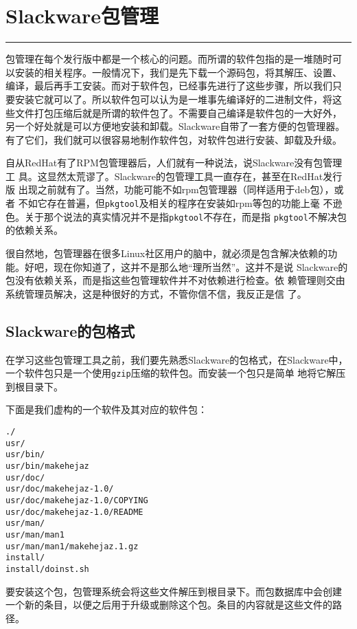 \chapter{Slackware包管理}
\label{chap:packageManagement}
\begin{flushleft}
\rule[0mm]{\textwidth}{.1pt}
\end{flushleft}

包管理在每个发行版中都是一个核心的问题。而所谓的软件包指的是一堆随时可
以安装的相关程序。一般情况下，我们是先下载一个源码包，将其解压、设置、
编译，最后再手工安装。而对于软件包，已经事先进行了这些步骤，所以我们只
要安装它就可以了。所以软件包可以认为是一堆事先编译好的二进制文件，将这
些文件打包压缩后就是所谓的软件包了。不需要自己编译是软件包的一大好外，
另一个好处就是可以方便地安装和卸载。Slackware自带了一套方便的包管理器。
有了它们，我们就可以很容易地制作软件包，对软件包进行安装、卸载及升级。

自从RedHat有了RPM包管理器后，人们就有一种说法，说Slackware没有包管理工
具。这显然太荒谬了。Slackware的包管理工具一直存在，甚至在RedHat发行版
出现之前就有了。当然，功能可能不如rpm包管理器（同样适用于deb包），或者
不如它存在普遍，但\texttt{pkgtool}及相关的程序在安装如rpm等包的功能上毫
不逊色。关于那个说法的真实情况并不是指\texttt{pkgtool}不存在，而是指
\texttt{pkgtool}不解决包的依赖关系。

很自然地，包管理器在很多Linux社区用户的脑中，就必须是包含解决依赖的功
能。好吧，现在你知道了，这并不是那么地``理所当然''。这并不是说
Slackware的包没有依赖关系，而是指这些包管理软件并不对依赖进行检查。依
赖管理则交由系统管理员解决，这是种很好的方式，不管你信不信，我反正是信
了。

\section{Slackware的包格式}
\label{sec:packageManagement:format}
在学习这些包管理工具之前，我们要先熟悉Slackware的包格式，在Slackware中，
一个软件包只是一个使用\texttt{gzip}压缩的软件包。而安装一个包只是简单
地将它解压到根目录下。

下面是我们虚构的一个软件及其对应的软件包：
\begin{Verbatim}[frame=single, commandchars=\\\{\}]
./
usr/
usr/bin/
usr/bin/makehejaz
usr/doc/
usr/doc/makehejaz-1.0/
usr/doc/makehejaz-1.0/COPYING
usr/doc/makehejaz-1.0/README
usr/man/
usr/man/man1
usr/man/man1/makehejaz.1.gz
install/
install/doinst.sh
\end{Verbatim}
要安装这个包，包管理系统会将这些文件解压到根目录下。而包数据库中会创建
一个新的条目，以便之后用于升级或删除这个包。条目的内容就是这些文件的路
径。

